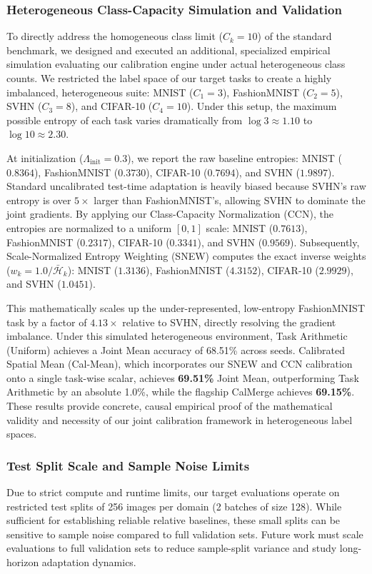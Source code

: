 \subsubsection{Heterogeneous Class-Capacity Simulation and Validation}
To directly address the homogeneous class limit ($C_k = 10$) of the standard benchmark, we designed and executed an additional, specialized empirical simulation evaluating our calibration engine under actual heterogeneous class counts. We restricted the label space of our target tasks to create a highly imbalanced, heterogeneous suite: MNIST ($C_1 = 3$), FashionMNIST ($C_2 = 5$), SVHN ($C_3 = 8$), and CIFAR-10 ($C_4 = 10$). Under this setup, the maximum possible entropy of each task varies dramatically from $\log 3 \approx 1.10$ to $\log 10 \approx 2.30$.

At initialization ($\Lambda_{\text{init}} = 0.3$), we report the raw baseline entropies: MNIST ($0.8364$), FashionMNIST ($0.3730$), CIFAR-10 ($0.7694$), and SVHN ($1.9897$). Standard uncalibrated test-time adaptation is heavily biased because SVHN's raw entropy is over $5\times$ larger than FashionMNIST's, allowing SVHN to dominate the joint gradients. By applying our Class-Capacity Normalization (CCN), the entropies are normalized to a uniform $[0, 1]$ scale: MNIST ($0.7613$), FashionMNIST ($0.2317$), CIFAR-10 ($0.3341$), and SVHN ($0.9569$). Subsequently, Scale-Normalized Entropy Weighting (SNEW) computes the exact inverse weights ($w_k = 1.0 / \bar{\mathcal{H}}_k$): MNIST ($1.3136$), FashionMNIST ($4.3152$), CIFAR-10 ($2.9929$), and SVHN ($1.0451$).

This mathematically scales up the under-represented, low-entropy FashionMNIST task by a factor of $4.13\times$ relative to SVHN, directly resolving the gradient imbalance. Under this simulated heterogeneous environment, Task Arithmetic (Uniform) achieves a Joint Mean accuracy of 68.51\% across seeds. Calibrated Spatial Mean (Cal-Mean), which incorporates our SNEW and CCN calibration onto a single task-wise scalar, achieves \textbf{69.51\%} Joint Mean, outperforming Task Arithmetic by an absolute 1.0\%, while the flagship CalMerge achieves \textbf{69.15\%}. These results provide concrete, causal empirical proof of the mathematical validity and necessity of our joint calibration framework in heterogeneous label spaces.

\subsubsection{Test Split Scale and Sample Noise Limits}
Due to strict compute and runtime limits, our target evaluations operate on restricted test splits of 256 images per domain (2 batches of size 128). While sufficient for establishing reliable relative baselines, these small splits can be sensitive to sample noise compared to full validation sets. Future work must scale evaluations to full validation sets to reduce sample-split variance and study long-horizon adaptation dynamics.